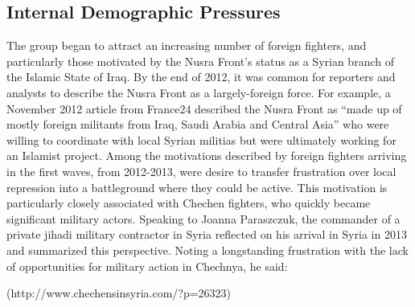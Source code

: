 \subsection{Internal Demographic Pressures}

The group began to attract an increasing number of foreign fighters, and particularly those motivated by the Nusra Front’s status as a Syrian branch of the Islamic State of Iraq. By the end of 2012, it was common for reporters and analysts to describe the Nusra Front as a largely-foreign force. For example, a November 2012 article from France24 described the Nusra Front as “made up of mostly foreign militants from Iraq, Saudi Arabia and Central Asia” who were willing to coordinate with local Syrian militias but were ultimately working for an Islamist project\autocite{fvc2012jabhat}. Among the motivations described by foreign fighters arriving in the first waves, from 2012-2013, were desire to transfer frustration over local repression into a battleground where they could be active. This motivation is particularly closely associated with Chechen fighters, who quickly became significant military actors. Speaking to Joanna Paraszczuk, the commander of a private jihadi military contractor in Syria reflected on his arrival in Syria in 2013 and summarized this perspective. Noting a longstanding frustration with the lack of opportunities for military action in Chechnya, he said:

(http://www.chechensinsyria.com/?p=26323)

